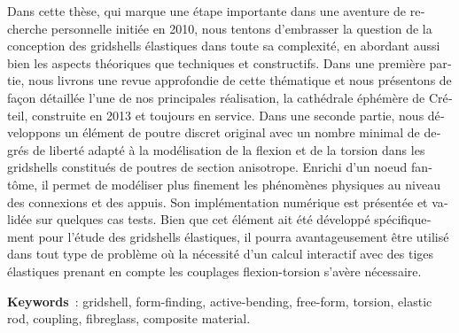 \begin{otherlanguage}{french}
{Dans cette thèse, qui marque une étape importante dans une aventure de recherche personnelle initiée en 2010, nous tentons d'embrasser la question de la conception des gridshells élastiques dans toute sa complexité, en abordant aussi bien les aspects théoriques que techniques et constructifs. Dans une première partie, nous livrons une revue approfondie de cette thématique et nous présentons de façon détaillée l'une de nos principales réalisation, la cathédrale éphémère de Créteil, construite en 2013 et toujours en service. Dans une seconde partie, nous développons un élément de poutre discret original avec un nombre minimal de degrés de liberté adapté à la modélisation de la flexion et de la torsion dans les gridshells constitués de poutres de section anisotrope. Enrichi d'un noeud fantôme, il permet de modéliser plus finement les phénomènes physiques au niveau des connexions et des appuis. Son implémentation numérique est présentée et validée sur quelques cas tests. Bien que cet élément ait été développé spécifiquement pour l'étude des gridshells élastiques, il pourra avantageusement être utilisé dans tout type de problème où la nécessité d'un calcul interactif avec des tiges élastiques prenant en compte les couplages flexion-torsion s'avère nécessaire.

\textbf{Keywords}~: gridshell, form-finding, active-bending, free-form, torsion, elastic rod, coupling, fibreglass, composite material.
}
\end{otherlanguage}
